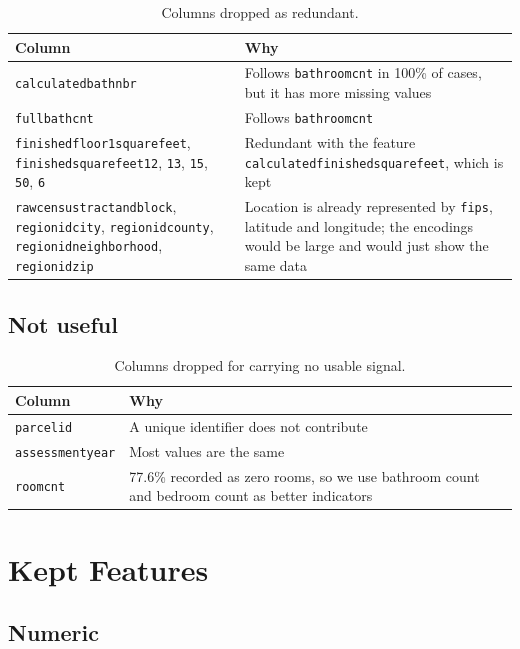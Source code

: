 \documentclass[sigconf,nonacm,10pt]{acmart}
\begin{document}
\begin{table}[t]
\caption{Columns dropped as redundant.}
\footnotesize
\begin{tabularx}{\textwidth}{@{}>{\raggedright\arraybackslash}p{7.5cm}>{\raggedright\arraybackslash}X@{}}
\toprule
Column & Why \\
\midrule
\texttt{calculatedbathnbr} & Follows \texttt{bathroomcnt} in 100\% of cases, but it has more missing values \\
\texttt{fullbathcnt} & Follows \texttt{bathroomcnt} \\
\texttt{finishedfloor1squarefeet}, \texttt{finishedsquarefeet12}, \texttt{13}, \texttt{15}, \texttt{50}, \texttt{6} & Redundant with the feature \texttt{calculatedfinishedsquarefeet}, which is kept \\
\texttt{rawcensustractandblock}, \texttt{regionidcity}, \texttt{regionidcounty}, \texttt{regionidneighborhood}, \texttt{regionidzip} & Location is already represented by \texttt{fips}, latitude and longitude; the encodings would be large and would just show the same data \\
\bottomrule
\end{tabularx}
\end{table}

\subsection{Not useful}

\begin{table}[h]
\caption{Columns dropped for carrying no usable signal.}
\small
\begin{tabularx}{\columnwidth}{@{}lX@{}}
\toprule
Column & Why \\
\midrule
\texttt{parcelid} & A unique identifier does not contribute \\
\texttt{assessmentyear} & Most values are the same \\
\texttt{roomcnt} & 77.6\% recorded as zero rooms, so we use bathroom count and bedroom count as better indicators \\
\bottomrule
\end{tabularx}
\end{table}

\section{Kept Features}

\subsection{Numeric}
\end{document}
